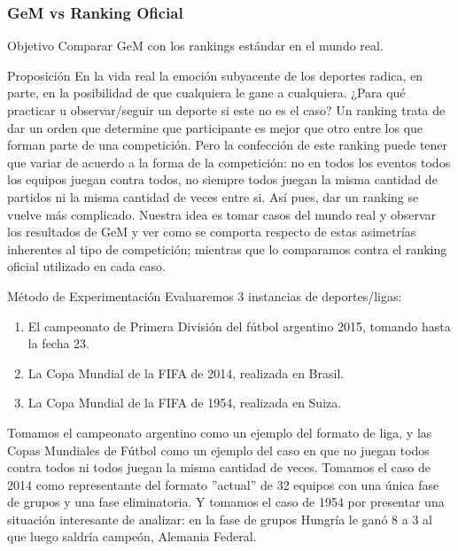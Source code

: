 \subsubsection{GeM vs Ranking Oficial}
\label{subsec:exp6}
\begin{LaTeXdescription}
    \item[Objetivo] Comparar GeM con los rankings estándar en el mundo real.\\

    \item[Proposici\'on] En la vida real la emoción subyacente de los deportes
        radica, en parte, en la posibilidad de que cualquiera le gane a
        cualquiera. ¿Para qué practicar u observar/seguir un deporte si este no
        es el caso?  Un ranking trata de dar un orden que determine que
        participante es mejor que otro entre los que forman parte de una
        competición. Pero la confección de este ranking puede tener que variar
        de acuerdo a la forma de la competición: no en todos los eventos todos
        los equipos juegan contra todos, no siempre todos juegan la misma
        cantidad de partidos ni la misma cantidad de veces entre si. Así pues,
        dar un ranking se vuelve más complicado. Nuestra idea es tomar casos del
        mundo real y observar los resultados de GeM y ver como se comporta
        respecto de estas asimetrías inherentes al tipo de competición; mientras
        que lo comparamos contra el ranking oficial utilizado en cada caso.\\

    \item[M\'etodo de Experimentaci\'on] Evaluaremos 3 instancias de
        deportes/ligas:

        \begin{enumerate}
            \item El campeonato de Primera División del fútbol argentino 2015,
                tomando hasta la fecha 23.

            \item La Copa Mundial de la FIFA de 2014, realizada en Brasil.

            \item La Copa Mundial de la FIFA de 1954, realizada en Suiza.
        \end{enumerate}
        \medskip

        \par Tomamos el campeonato argentino como un ejemplo del formato de
        liga, y las Copas Mundiales de Fútbol como un ejemplo del caso en que no
        juegan todos contra todos ni todos juegan la misma cantidad de veces.
        Tomamos el caso de 2014 como representante del formato ''actual'' de 32
        equipos con una única fase de grupos y una fase eliminatoria. Y tomamos
        el caso de 1954 por presentar una situación interesante de analizar: en
        la fase de grupos Hungría le ganó 8 a 3 al que luego saldría campeón,
        Alemania Federal.


\end{LaTeXdescription}
